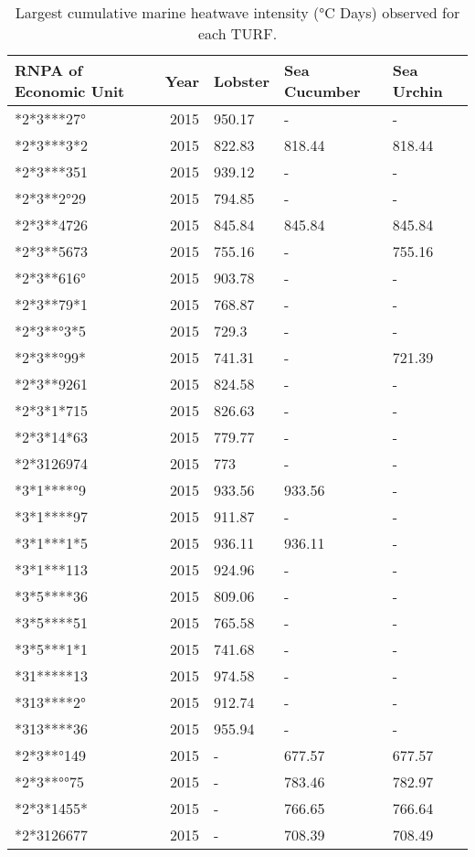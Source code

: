\begin{table}

\caption{\label{tab:hist_max_mhw_ref_points}Largest cumulative marine heatwave intensity (°C Days) observed for each TURF.}
\centering
\begin{tabular}[t]{lrlll}
\toprule
RNPA of Economic Unit & Year & Lobster & Sea Cucumber & Sea Urchin\\
\midrule
*2*3***27° & 2015 & 950.17 & - & -\\
*2*3***3*2 & 2015 & 822.83 & 818.44 & 818.44\\
*2*3***351 & 2015 & 939.12 & - & -\\
*2*3**2°29 & 2015 & 794.85 & - & -\\
*2*3**4726 & 2015 & 845.84 & 845.84 & 845.84\\
*2*3**5673 & 2015 & 755.16 & - & 755.16\\
*2*3**616° & 2015 & 903.78 & - & -\\
*2*3**79*1 & 2015 & 768.87 & - & -\\
*2*3**°3*5 & 2015 & 729.3 & - & -\\
*2*3**°99* & 2015 & 741.31 & - & 721.39\\
*2*3**9261 & 2015 & 824.58 & - & -\\
*2*3*1*715 & 2015 & 826.63 & - & -\\
*2*3*14*63 & 2015 & 779.77 & - & -\\
*2*3126974 & 2015 & 773 & - & -\\
*3*1****°9 & 2015 & 933.56 & 933.56 & -\\
*3*1****97 & 2015 & 911.87 & - & -\\
*3*1***1*5 & 2015 & 936.11 & 936.11 & -\\
*3*1***113 & 2015 & 924.96 & - & -\\
*3*5****36 & 2015 & 809.06 & - & -\\
*3*5****51 & 2015 & 765.58 & - & -\\
*3*5***1*1 & 2015 & 741.68 & - & -\\
*31*****13 & 2015 & 974.58 & - & -\\
*313****2° & 2015 & 912.74 & - & -\\
*313****36 & 2015 & 955.94 & - & -\\
*2*3**°149 & 2015 & - & 677.57 & 677.57\\
*2*3**°°75 & 2015 & - & 783.46 & 782.97\\
*2*3*1455* & 2015 & - & 766.65 & 766.64\\
*2*3126677 & 2015 & - & 708.39 & 708.49\\

\end{tabular}
\end{table}
